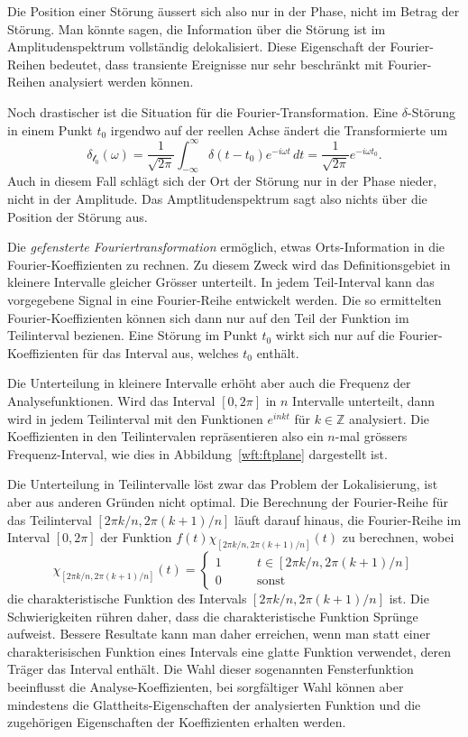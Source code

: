 Die Position einer Störung äussert sich also nur in der Phase, nicht
im Betrag der Störung.
Man könnte sagen, die Information über die Störung ist im Amplitudenspektrum
vollständig delokalisiert.
Diese Eigenschaft der Fourier-Reihen bedeutet, dass transiente Ereignisse
nur sehr beschränkt mit Fourier-Reihen analysiert werden können.

Noch drastischer ist die Situation für die Fourier-Transformation.
Eine $\delta$-Störung in einem Punkt $t_0$ irgendwo auf der reellen Achse
ändert die Transformierte um
\[
\mathcal{\delta_{t_0}}(\omega)
=
\frac{1}{\sqrt{2\pi}} \int_{-\infty}^\infty \delta(t-t_0) e^{-i\omega t}\,dt
=
\frac1{\sqrt{2\pi}} e^{-i\omega t_0}.
\]
Auch in diesem Fall schlägt sich der Ort der Störung nur in der Phase nieder,
nicht in der Amplitude.
Das Amptlitudenspektrum sagt also nichts über die Position der
Störung aus.

Die {\em gefensterte Fouriertransformation} ermöglich, etwas Orts-Information
in die Fourier-Koeffizienten zu rechnen.
Zu diesem Zweck wird das Definitionsgebiet in kleinere Intervalle gleicher
Grösser unterteilt.
In jedem Teil-Interval kann das vorgegebene Signal in eine Fourier-Reihe
entwickelt werden.
Die so ermittelten Fourier-Koeffizienten können sich dann nur auf den Teil
der Funktion im Teilinterval bezienen.
Eine Störung im Punkt $t_0$ wirkt sich nur auf die Fourier-Koeffizienten
für das Interval aus, welches $t_0$ enthält.

Die Unterteilung in kleinere Intervalle erhöht aber auch die Frequenz
der Analysefunktionen.
Wird das Interval $[0,2\pi]$ in $n$ Intervalle unterteilt, dann wird in
jedem Teilinterval mit den Funktionen $e^{inkt}$ für $k\in\mathbb Z$
analysiert.
Die Koeffizienten in den Teilintervalen repräsentieren also ein $n$-mal
grössers Frequenz-Interval, wie dies in Abbildung~\ref{wft:ftplane}
dargestellt ist.

Die Unterteilung in Teilintervalle löst zwar das Problem der Lokalisierung,
ist aber aus anderen Gründen nicht optimal.
Die Berechnung der Fourier-Reihe für das Teilinterval $[2\pi k/n, 2\pi(k+1)/n]$
läuft darauf hinaus, die Fourier-Reihe im Interval $[0,2\pi]$ der Funktion
$f(t) \chi_{[2\pi k/n, 2\pi(k+1)/n]}(t)$
zu berechnen, wobei 
\[
\chi_{[2\pi k/n, 2\pi(k+1)/n]}(t)
=
\begin{cases}
1&\qquad t \in [2\pi k/n, 2\pi(k+1)/n]\\
0&\qquad\text{sonst}
\end{cases}
\]
die charakteristische Funktion des Intervals $[2\pi k/n, 2\pi(k+1)/n]$
ist.
Die Schwierigkeiten rühren daher, dass die charakteristische
Funktion Sprünge aufweist.
Bessere Resultate kann man daher erreichen, wenn man statt einer
charakterisischen Funktion eines Intervals eine glatte Funktion
verwendet, deren Träger das Interval enthält.
Die Wahl dieser sogenannten Fensterfunktion beeinflusst die
Analyse-Koeffizienten, bei sorgfältiger Wahl können aber mindestens
die Glattheits-Eigenschaften der analysierten Funktion und die zugehörigen
Eigenschaften der Koeffizienten erhalten werden.

